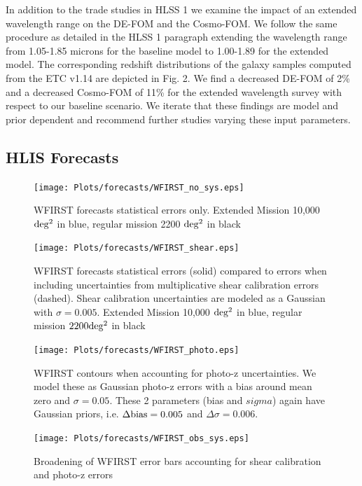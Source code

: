 In addition to the trade studies in HLSS 1 we examine the impact of an extended wavelength range on the DE-FOM and the Cosmo-FOM. We follow the same procedure as detailed in the HLSS 1 paragraph extending the wavelength range from 1.05-1.85 microns for the baseline model to 1.00-1.89 for the extended model. The corresponding redshift distributions of the galaxy samples computed from the ETC v1.14 are depicted in Fig. 2. We find a decreased DE-FOM of 2\% and a decreased Cosmo-FOM of 11\% for the extended wavelength survey with respect to our baseline scenario. We iterate that these findings are model and prior dependent and recommend further studies varying these input parameters.

\subsection{HLIS Forecasts}
\label{sec:HLISforecasts}



\begin{figure}
\texttt{[image: Plots/forecasts/WFIRST\_no\_sys.eps]}
\caption{WFIRST forecasts statistical errors only. Extended Mission 10,000 $\mathrm{deg^2}$ in blue, regular mission 2200 $\mathrm{deg^2}$ in black}
         \label{fi:lsst1}
\end{figure}

\begin{figure}
\texttt{[image: Plots/forecasts/WFIRST\_shear.eps]}
\caption{WFIRST forecasts statistical errors (solid) compared to errors when including uncertainties from multiplicative shear calibration errors (dashed). Shear calibration uncertainties are modeled as a Gaussian with $\sigma=0.005$. Extended Mission 10,000 $\mathrm{deg^2}$ in blue, regular mission $2200 \mathrm{deg^2}$ in black}
         \label{fi:lsst1}
\end{figure}

\begin{figure}
\texttt{[image: Plots/forecasts/WFIRST\_photo.eps]}
\caption{WFIRST contours when accounting for photo-z uncertainties. We model these as Gaussian photo-z errors with a bias around mean zero and $\sigma=0.05$. These 2 parameters (bias and $sigma$) again have Gaussian priors, i.e. $\Delta \mathrm{bias}=0.005$ and $\Delta \sigma=0.006$.}
         \label{fi:lsst1}
\end{figure}

\begin{figure}
\texttt{[image: Plots/forecasts/WFIRST\_obs\_sys.eps]}
\caption{Broadening of WFIRST error bars accounting for shear calibration and photo-z errors}
         \label{fi:lsst1}
\end{figure}

